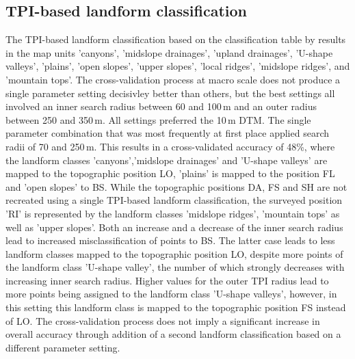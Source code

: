 \documentclass[preprint,12pt,authoryear]{elsarticle}
\begin{document}
\subsection{TPI-based landform classification}
The TPI-based landform classification based on the  classification table by \cite{Weiss2000} results in the map units 'canyons', 'midslope drainages', 'upland drainages', 'U-shape valleys', 'plains', 'open slopes', 'upper slopes', 'local ridges', 'midslope ridges', and 'mountain tops'. The cross-validation process at macro scale does not produce a single parameter setting decisivley better than others, but the best settings all involved an inner search radius between 60 and 100\,m and an outer radius between 250  and 350\,m. All settings preferred the 10\,m DTM. The single parameter combination that was most frequently at first place applied search radii of 70 and 250\,m. This results in a cross-validated accuracy of 48\%, where the landform classes 'canyons','midslope drainages' and 'U-shape valleys' are mapped to the topographic position LO, 'plains' is mapped to the position FL and 'open slopes' to BS. While the topographic positions DA, FS and SH are not recreated using a single TPI-based landform classification, the surveyed position 'RI' is represented by the landform classes 'midslope ridges', 'mountain tops' as well as 'upper slopes'. Both an increase and a decrease of the inner search radius lead to increased misclassification of points to BS. The latter case leads to less landform classes mapped to the topographic position LO, despite more points of the landform class 'U-shape valley', the number of which strongly decreases with increasing inner search radius. Higher values for the outer TPI radius lead to more points being assigned to the landform class 'U-shape valleys', however, in this setting this landform class is mapped to the topographic position FS instead of LO. The cross-validation process does not imply a significant increase in overall accuracy through addition of a second landform classification based on a different parameter setting.   
\end{document}
